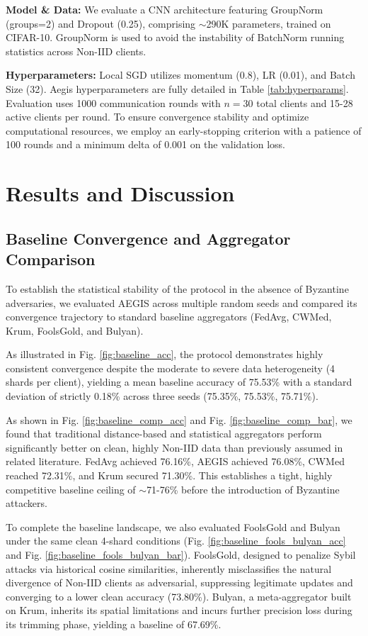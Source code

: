 \documentclass[10pt, conference]{IEEEtran}
\begin{document}
\textbf{Model \& Data:} We evaluate a CNN architecture featuring GroupNorm (groups=2) and Dropout (0.25), comprising $\sim$290K parameters, trained on CIFAR-10. GroupNorm is used to avoid the instability of BatchNorm running statistics across Non-IID clients. 

\textbf{Hyperparameters:} Local SGD utilizes momentum (0.8), LR (0.01), and Batch Size (32). Aegis hyperparameters are fully detailed in Table \ref{tab:hyperparams}. Evaluation uses 1000 communication rounds with $n=30$ total clients and 15-28 active clients per round. To ensure convergence stability and optimize computational resources, we employ an early-stopping criterion with a patience of 100 rounds and a minimum delta of 0.001 on the validation loss.

\section{Results and Discussion}

\subsection{Baseline Convergence and Aggregator Comparison}
To establish the statistical stability of the protocol in the absence of Byzantine adversaries, we evaluated AEGIS across multiple random seeds and compared its convergence trajectory to standard baseline aggregators (FedAvg, CWMed, Krum, FoolsGold, and Bulyan). 

As illustrated in Fig. \ref{fig:baseline_acc}, the protocol demonstrates highly consistent convergence despite the moderate to severe data heterogeneity (4 shards per client), yielding a mean baseline accuracy of 75.53\% with a standard deviation of strictly 0.18\% across three seeds (75.35\%, 75.53\%, 75.71\%). 

As shown in Fig. \ref{fig:baseline_comp_acc} and Fig. \ref{fig:baseline_comp_bar}, we found that traditional distance-based and statistical aggregators perform significantly better on clean, highly Non-IID data than previously assumed in related literature. FedAvg achieved 76.16\%, AEGIS achieved 76.08\%, CWMed reached 72.31\%, and Krum secured 71.30\%. This establishes a tight, highly competitive baseline ceiling of $\sim$71-76\% before the introduction of Byzantine attackers.

To complete the baseline landscape, we also evaluated FoolsGold and Bulyan under the same clean 4-shard conditions (Fig. \ref{fig:baseline_fools_bulyan_acc} and Fig. \ref{fig:baseline_fools_bulyan_bar}). FoolsGold, designed to penalize Sybil attacks via historical cosine similarities, inherently misclassifies the natural divergence of Non-IID clients as adversarial, suppressing legitimate updates and converging to a lower clean accuracy (73.80\%). Bulyan, a meta-aggregator built on Krum, inherits its spatial limitations and incurs further precision loss during its trimming phase, yielding a baseline of 67.69\%.
\end{document}
